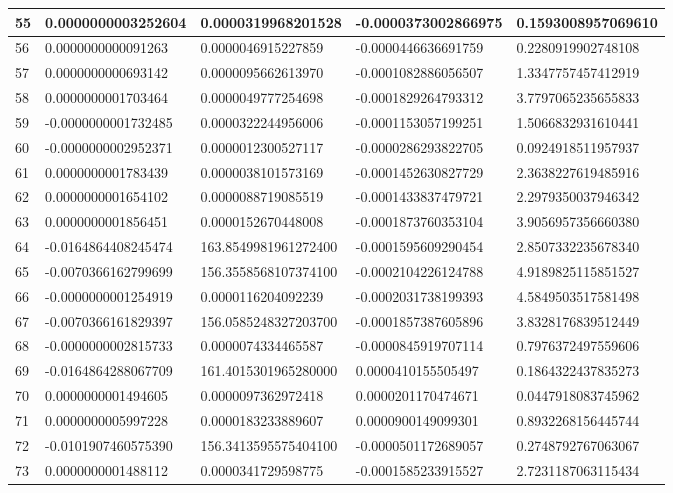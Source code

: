 \begin{center}
\begin{longtable}{|p{0.5cm}|p{3.5cm}|p{3.5cm}|p{3.5cm}|p{3.5cm}|}
\hline
55  & 0.0000000003252604  & 0.0000319968201528  & -0.0000373002866975  & 0.1593008957069610\\
\hline
56  & 0.0000000000091263  & 0.0000046915227859  & -0.0000446636691759  & 0.2280919902748108\\
\hline
57  & 0.0000000000693142  & 0.0000095662613970  & -0.0001082886056507  & 1.3347757457412919\\
\hline
58  & 0.0000000001703464  & 0.0000049777254698  & -0.0001829264793312  & 3.7797065235655833\\
\hline
59  & -0.0000000001732485  & 0.0000322244956006  & -0.0001153057199251  & 1.5066832931610441\\
\hline
60  & -0.0000000002952371  & 0.0000012300527117  & -0.0000286293822705  & 0.0924918511957937\\
\hline
61  & 0.0000000001783439  & 0.0000038101573169  & -0.0001452630827729  & 2.3638227619485916\\
\hline
62  & 0.0000000001654102  & 0.0000088719085519  & -0.0001433837479721  & 2.2979350037946342\\
\hline
63  & 0.0000000001856451  & 0.0000152670448008  & -0.0001873760353104  & 3.9056957356660380\\
\hline
64  & -0.0164864408245474  & 163.8549981961272400  & -0.0001595609290454  & 2.8507332235678340\\
\hline
65  & -0.0070366162799699  & 156.3558568107374100  & -0.0002104226124788  & 4.9189825115851527\\
\hline
66  & -0.0000000001254919  & 0.0000116204092239  & -0.0002031738199393  & 4.5849503517581498\\
\hline
67  & -0.0070366161829397  & 156.0585248327203700  & -0.0001857387605896  & 3.8328176839512449\\
\hline
68  & -0.0000000002815733  & 0.0000074334465587  & -0.0000845919707114  & 0.7976372497559606\\
\hline
69  & -0.0164864288067709  & 161.4015301965280000  & 0.0000410155505497  & 0.1864322437835273\\
\hline
70  & 0.0000000001494605  & 0.0000097362972418  & 0.0000201170474671  & 0.0447918083745962\\
\hline
71  & 0.0000000005997228  & 0.0000183233889607  & 0.0000900149099301  & 0.8932268156445744\\
\hline
72  & -0.0101907460575390  & 156.3413595575404100  & -0.0000501172689057  & 0.2748792767063067\\
\hline
73  & 0.0000000001488112  & 0.0000341729598775  & -0.0001585233915527  & 2.7231187063115434\\

\end{longtable}
\end{center}
